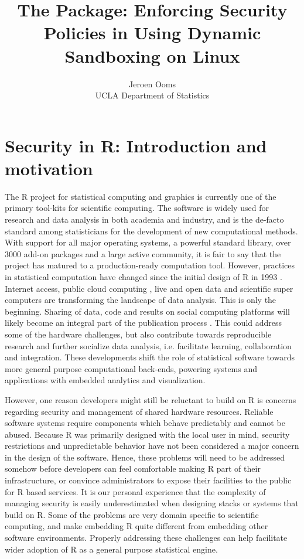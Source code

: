 \documentclass{jss}
\author{Jeroen Ooms\\UCLA Department of Statistics}
\title{The \RAppArmor Package: Enforcing Security Policies in \R Using Dynamic
Sandboxing on Linux}
\newcommand{\R}{\textsf{R}\xspace}
\begin{document}
\section[Security in R: Introduction and motivation]{Security in \R:
Introduction and motivation}

The \R project for statistical computing and graphics \citep{R-project} is
currently one of the primary tool-kits for scientific computing. The software is
widely used for research and data analysis in both academia and industry, and is
the de-facto standard among statisticians for the development of new
computational methods. With support for all major operating systems, a powerful
standard library, over 3000 add-on packages and a large active community, it is
fair to say that the project has matured to a production-ready computation tool.
However, practices in statistical computation have changed since the initial
design of \R in 1993 \citep{ihaka1998r}. Internet access, public cloud computing
\citep{armbrust2010view}, live and open data and scientific super computers are
transforming the landscape of data analysis. This is only the beginning. Sharing
of data, code and results on social computing platforms will likely become an
integral part of the publication process \citep{asareport}. This could address
some of the hardware challenges, but also contribute towards reproducible
research and further socialize data analysis, i.e. facilitate learning,
collaboration and integration. These developments shift the role of
statistical software towards more general purpose computational back-ends,
powering systems and applications with embedded analytics and visualization.

However, one reason developers might still be reluctant to build on \R is
concerns regarding security and management of shared hardware resources.
Reliable software systems require components which behave predictably and
cannot be abused. Because \R was primarily designed with the local user in
mind, security restrictions and unpredictable behavior have not been considered
a major concern in the design of the software. Hence, these problems will need
to be addressed somehow before developers can feel comfortable making \R part
of their infrastructure, or convince administrators to expose their facilities
to the public for \R based services. It is our personal experience that the
complexity of managing security is easily underestimated when designing stacks
or systems that build on \R. Some of the problems are very domain specific to
scientific computing, and make embedding \R quite different from embedding
other software environments. Properly addressing these challenges can help
facilitate wider adoption of \R as a general purpose statistical engine.
\end{document}
